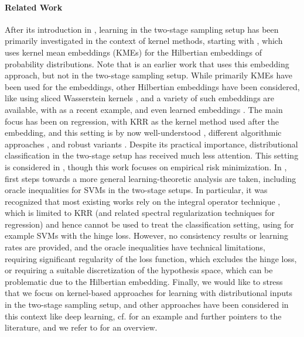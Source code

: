 \documentclass[letterpaper]{article} %
\begin{document}
\paragraph{Related Work}
After its introduction in \cite{poczos2013distribution}, learning in the two-stage sampling setup has been primarily investigated in the context of kernel methods, starting with \cite{szabo2015two}, which uses kernel mean embeddings (KMEs) for the Hilbertian embeddings of probability distributions.
Note that \cite{muandet2012learning} is an earlier work that uses this embedding approach, but not in the two-stage sampling setup.
While primarily KMEs have been used for the embeddings, other Hilbertian embeddings have been considered, like using sliced Wasserstein kernels \cite{meunier2022distribution}, and a variety of such embeddings are available, with \cite{bonnier2023kernelized} as a recent example, and even learned embeddings \cite{kachaiev2024learning}.
The main focus has been on regression, with KRR as the kernel method used after the embedding, and this setting is by now well-understood \cite{szabo2016learning,fang2020optimal}, different algorithmic approaches \cite{mucke2021stochastic}, and robust variants \cite{yu2021robust}.
Despite its practical importance, distributional classification in the two-stage setup has received much less attention.
This setting is considered in \cite{lopezpaz2015towards}, though this work focuses on empirical risk minimization.
In \cite{fiedler2024statistical}, first steps towards a more general learning-theoretic analysis are taken, including oracle inequalities for SVMs in the two-stage setups.
In particular, it was recognized that most existing works rely on the integral operator technique \cite{caponnetto2007optimal}, which is limited to KRR (and related spectral regularization techniques for regression) and hence cannot be used to treat the classification setting, using for example SVMs with the hinge loss.
However, no consistency results or learning rates are provided, and the oracle inequalities have technical limitations, requiring significant regularity of the loss function, which excludes the hinge loss, or requiring a suitable discretization of the hypothesis space, which can be problematic due to the Hilbertian embedding.
Finally, we would like to stress that we focus on kernel-based approaches for learning with distributional inputs in the two-stage sampling setup, and other approaches have been considered in this context like deep learning, cf. \cite{liu2025generalization} for an example and further pointers to the literature, and we refer to \cite[Section~C]{kachaiev2024learning} for an overview.
\end{document}
